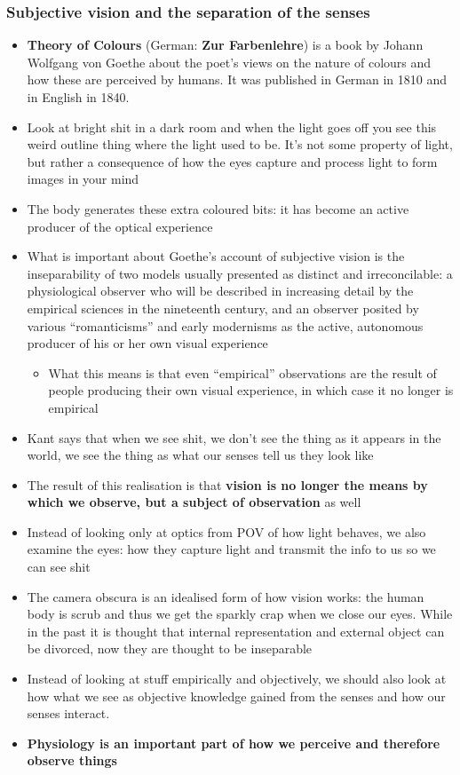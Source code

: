 \documentclass[a4paper]{article}
\begin{document}
\subsubsection{Subjective vision and the separation of the senses}
\begin{itemize}
	\item \textbf{Theory of Colours} (German: \textbf{Zur Farbenlehre}) is a book by Johann Wolfgang von Goethe about the poet's views on the nature of colours and how these are perceived by humans. It was published in German in 1810 and in English in 1840.
	\item Look at bright shit in a dark room and when the light goes off you see this weird outline thing where the light used to be. It's not some property of light, but rather a consequence of how the eyes capture and process light to form images in your mind
	\item The body generates these extra coloured bits: it has become an active producer of the optical experience
	\item What is important about Goethe's account of subjective vision is the inseparability of two models usually presented as distinct and irreconcilable: a physiological observer who will be described in increasing detail by the empirical sciences in the nineteenth century, and an observer posited by various ``romanticisms'' and early modernisms as the active, autonomous producer of his or her own visual experience
	\begin{itemize}[label=$\circ$]
		\item What this means is that even “empirical” observations are the result of people producing their own visual experience, in which case it no longer is empirical
	\end{itemize}
	\item Kant says that when we see shit, we don't see the thing as it appears in the world, we see the thing as what our senses tell us they look like
	\item The result of this realisation is that \textbf{vision is no longer the means by which we observe, but a subject of observation} as well
	\item Instead of looking only at optics from POV of how light behaves, we also examine the eyes: how they capture light and transmit the info to us so we can see shit
	\item The camera obscura is an idealised form of how vision works: the human body is scrub and thus we get the sparkly crap when we close our eyes. While in the past it is thought that internal representation and external object can be divorced, now they are thought to be inseparable
	\item Instead of looking at stuff empirically and objectively, we should also look at how what we see as objective knowledge gained from the senses and how our senses interact. 
	\item \textbf{Physiology is an important part of how we perceive and therefore observe things}
\end{itemize}
\end{document}
